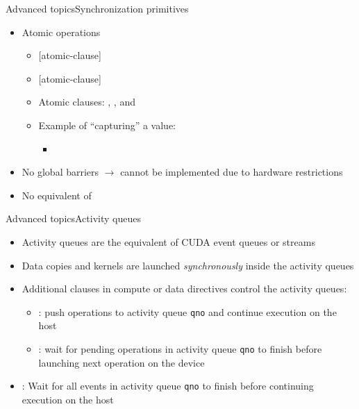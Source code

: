 \documentclass[12pt,aspectratio=169]{beamer}
\begin{document}
\begin{frame}[fragile]{Advanced topics}{Synchronization primitives}
  \begin{itemize}
  \item Atomic operations
    \begin{itemize}
    \item {} [atomic-clause]
    \item {} [atomic-clause]
    \item Atomic clauses: , ,
       and 
    \item Example of ``capturing'' a value:
      \begin{itemize}
      \item {}
      \end{itemize}
    \end{itemize}
  \item No global barriers $\rightarrow$ cannot be implemented due to hardware restrictions
  \item No equivalent of 
  \end{itemize}
\end{frame}

\begin{frame}[fragile]{Advanced topics}{Activity queues}
  \begin{itemize}
  \item Activity queues are the equivalent of CUDA event queues or streams
  \item Data copies and kernels are launched \emph{synchronously} inside the activity queues
  \item Additional clauses in compute or data directives control the activity queues:
    \begin{itemize}
    \item {}: push operations to activity queue \texttt{qno} and continue execution on the host
    \item {}: wait for pending operations in activity queue \texttt{qno} to finish before launching next operation on the device
    \end{itemize}
  \item {}: Wait for all events in activity queue \texttt{qno} to finish before continuing execution on the host
  \end{itemize}
\end{frame}
\end{document}
